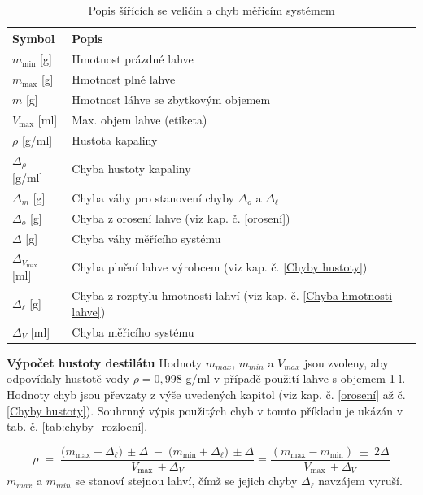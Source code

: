 \begin{table}[H]
    \centering
    \begin{tabular}{|l|l|}
        \hline
        \textbf{Symbol} & \textbf{Popis} \\ \hline \hline
        $m_{\text{min}}$ [g] & Hmotnost prázdné lahve \\ \hline
        $m_{\text{max}}$ [g]& Hmotnost plné lahve \\ \hline
        $m$ [g]& Hmotnost láhve se zbytkovým objemem \\ \hline
        $V_{\text{max}}$ [ml] & Max. objem lahve (etiketa) \\ \hline
        $\rho$ [g/ml]& Hustota kapaliny \\ \hline
        $\Delta_{\rho}$ [g/ml] & Chyba hustoty kapaliny \\ \hline
        $\Delta_m$ [g]& Chyba váhy pro stanovení chyby $\Delta_o$ a $\Delta_\ell$ \\ \hline
        $\Delta_o$ [g]& Chyba z orosení lahve (viz kap. č. \ref{orosení}) \\ \hline
        $\Delta$ [g]& Chyba váhy měřícího systému \\ \hline
        $\Delta_{V_{\text{max}}}$ [ml]& Chyba plnění lahve výrobcem (viz kap. č. \ref{Chyby hustoty}) \\ \hline
        $\Delta_\ell$ [g]& Chyba z rozptylu hmotnosti lahví (viz kap. č. \ref{Chyba hmotnosti lahve}) \\ \hline
        $\Delta_V$ [ml]& Chyba měřicího systému \\ \hline
    \end{tabular}
    \caption{Popis šířících se veličin a chyb měřicím systémem}
    \label{tab:popis-symbolu}
\end{table}

\noindent\textbf{Výpočet hustoty destilátu} 
\smallskip
\newline
Hodnoty $m_{max}$, $m_{min}$ a $V_{max}$ jsou zvoleny, aby odpovídaly hustotě vody $\rho = 0,998$ g/ml v případě použití lahve s objemem 1 l. Hodnoty chyb jsou převzaty z výše uvedených kapitol (viz kap. č. \ref{orosení} až č. \ref{Chyby hustoty}). Souhrnný výpis použitých chyb v tomto příkladu je ukázán v tab. č. \ref{tab:chyby_rozloení}.

\begin{equation}
    \rho \;=\;
\frac{\bigl(m_{\max}+\Delta_{\ell}\bigr)\,\pm\Delta
      \;-\;\bigl(m_{\min}+\Delta_{\ell}\bigr)\,\pm\Delta}
     {V_{\max}\,\pm\Delta_V} = \frac{(m_{\max}-m_{\min})\;\pm\;2\Delta}
     {V_{\max}\,\pm\Delta_V}   
     \label{hustotaa}
\end{equation}
\bigskip
$m_{max}$ a $m_{min}$ se stanoví stejnou lahví, čímž se jejich chyby $\Delta_\ell$ navzájem vyruší.

